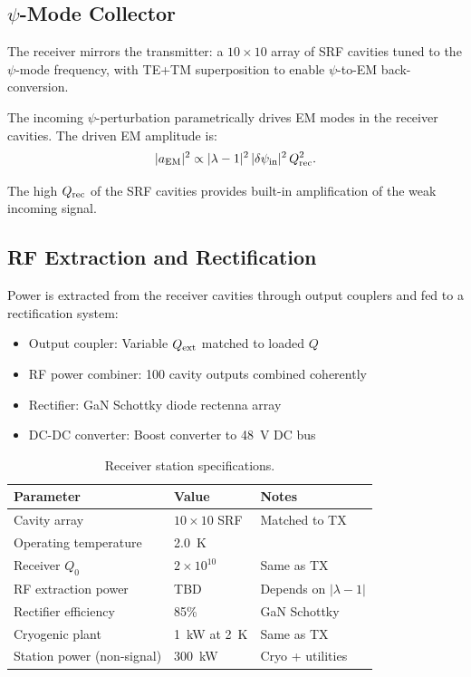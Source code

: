 \documentclass[11pt,letterpaper]{article}
\begin{document}
\subsection{$\psi$-Mode Collector}

The receiver mirrors the transmitter: a $10 \times 10$ array of SRF
cavities tuned to the $\psi$-mode frequency, with TE+TM superposition
to enable $\psi$-to-EM back-conversion.

The incoming $\psi$-perturbation parametrically drives EM modes in the
receiver cavities. The driven EM amplitude is:
\begin{equation}
|a_{\rm EM}|^2 \propto |\lambda - 1|^2\,|\delta\psi_{\rm in}|^2\,Q_{\rm rec}^2.
\end{equation}

The high $Q_{\rm rec}$ of the SRF cavities provides built-in
amplification of the weak incoming signal.

\subsection{RF Extraction and Rectification}

Power is extracted from the receiver cavities through output couplers
and fed to a rectification system:
\begin{itemize}
\item Output coupler: Variable $Q_{\rm ext}$ matched to loaded $Q$
\item RF power combiner: 100 cavity outputs combined coherently
\item Rectifier: GaN Schottky diode rectenna array
\item DC-DC converter: Boost converter to 48~V DC bus
\end{itemize}

\begin{table}[H]
\caption{Receiver station specifications.}
\begin{tabular}{lll}
\toprule
Parameter & Value & Notes \\
\midrule
Cavity array & $10 \times 10$ SRF & Matched to TX \\
Operating temperature & 2.0~K & \\
Receiver $Q_0$ & $2 \times 10^{10}$ & Same as TX \\
RF extraction power & TBD & Depends on $|\lambda-1|$ \\
Rectifier efficiency & 85\% & GaN Schottky \\
Cryogenic plant & 1~kW at 2~K & Same as TX \\
Station power (non-signal) & 300~kW & Cryo + utilities \\
\bottomrule
\end{tabular}
\end{table}
\end{document}
